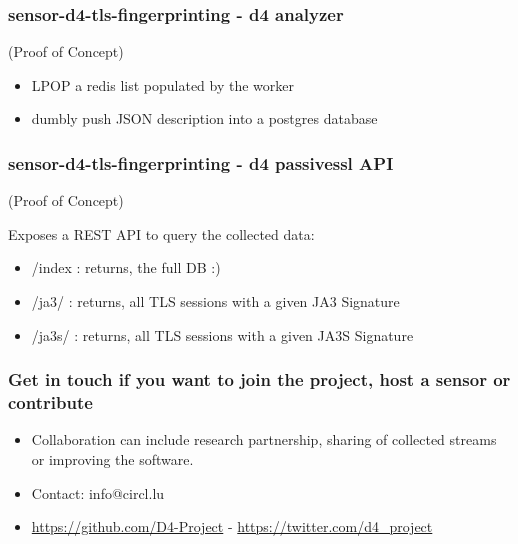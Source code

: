 \documentclass{beamer}
\begin{document}
\begin{frame}[fragile]
        \frametitle{sensor-d4-tls-fingerprinting - d4 analyzer} 
        (Proof of Concept)
        \begin{itemize}
          \item LPOP a redis list populated by the worker
          \item dumbly push JSON description into a postgres database
        \end{itemize}
\end{frame}


\begin{frame}[fragile]
        \frametitle{sensor-d4-tls-fingerprinting - d4 passivessl API} 
        (Proof of Concept)
        
        Exposes a REST API to query the collected data:
        \begin{itemize}
          \item /index : returns, the full DB :)
          \item /ja3/ : returns, all TLS sessions with a given JA3 Signature
          \item /ja3s/ : returns, all TLS sessions with a given JA3S Signature
        \end{itemize}
\end{frame}


\begin{frame}
\frametitle{Get in touch if you want to join the project, host a sensor or contribute}
\begin{itemize}
\item Collaboration can include research partnership, sharing of collected streams or improving the software.
\item Contact: info@circl.lu
\item \url{https://github.com/D4-Project} -  \url{https://twitter.com/d4_project}
\end{itemize}
\end{frame}
\end{document}
